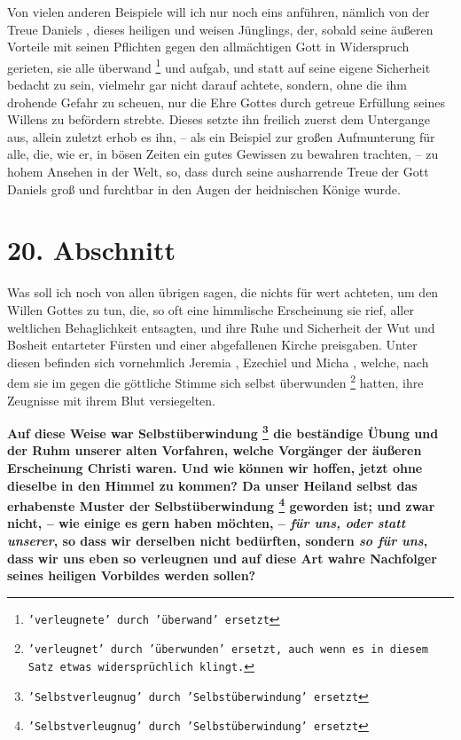 Von vielen anderen Beispiele will ich nur noch eins anführen, nämlich von der
Treue Daniels , dieses heiligen  und
weisen Jünglings, der, sobald seine äußeren
Vorteile mit seinen Pflichten gegen den allmächtigen Gott in Widerspruch
gerieten, sie alle überwand \footnote{\texttt{'verleugnete' durch 'überwand'
ersetzt}} und aufgab, und statt auf seine eigene
Sicherheit bedacht zu sein, vielmehr gar nicht darauf achtete, sondern, ohne die
ihm drohende Gefahr zu scheuen, nur die Ehre Gottes durch getreue Erfüllung
seines Willens zu befördern strebte. Dieses setzte ihn freilich zuerst dem
Untergange aus, allein zuletzt erhob es ihn, -- als ein Beispiel zur großen
Aufmunterung für alle, die, wie er, in bösen Zeiten ein gutes Gewissen zu
bewahren trachten, -- zu hohem Ansehen in der Welt, so, dass durch seine
ausharrende Treue der Gott Daniels groß und furchtbar in den Augen der
heidnischen Könige wurde.

\section{20. Abschnitt} \label{kap4_ab20}

Was soll ich noch von allen übrigen sagen, die nichts für wert achteten, um den
Willen Gottes zu tun, die, so oft eine himmlische Erscheinung sie rief, aller
weltlichen Behaglichkeit entsagten, und ihre Ruhe und Sicherheit der Wut und
Bosheit entarteter Fürsten und einer abgefallenen Kirche 
preisgaben. Unter
diesen befinden sich vornehmlich Jeremia , Ezechiel
 und Micha , welche, nach dem
sie im gegen die göttliche Stimme sich selbst überwunden
\footnote{\texttt{'verleugnet' durch 'überwunden' ersetzt, auch wenn es in diesem Satz
etwas widersprüchlich klingt.}} hatten, ihre Zeugnisse
mit ihrem Blut versiegelten.

\medskip

\label{ref:04_20_opfertod}
  \textbf{Auf diese Weise war Selbstüberwindung
\footnote{\texttt{'Selbstverleugnug' durch 'Selbstüberwindung' ersetzt}}
die beständige Übung und der Ruhm
unserer alten Vorfahren, welche Vorgänger der äußeren Erscheinung Christi waren.
Und wie können wir hoffen, jetzt ohne dieselbe in den Himmel  zu kommen? Da
unser Heiland selbst das erhabenste Muster der Selbstüberwindung \footnote{\texttt{'Selbstverleugnug'
durch 'Selbstüberwindung' ersetzt}} geworden ist;
und zwar nicht, -- wie einige es gern haben möchten, -- \textit{für uns, oder
statt
unserer}, so dass wir derselben nicht bedürften, sondern \textit{so für uns}, dass
wir uns eben so verleugnen und auf diese Art wahre Nachfolger seines heiligen
Vorbildes werden sollen?}


